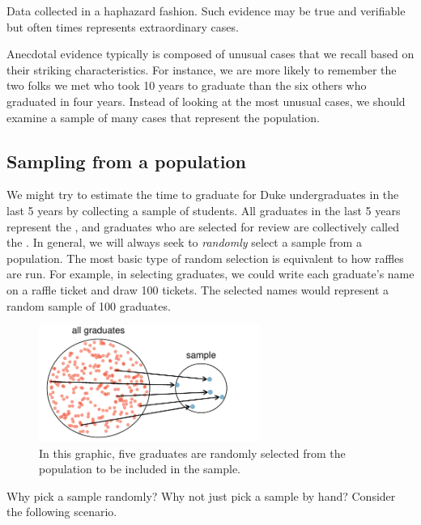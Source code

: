 \begin{termBox}{
Data collected in a haphazard fashion. Such evidence may be true and verifiable but often times represents extraordinary cases.}
\end{termBox}

Anecdotal evidence typically is composed of unusual cases that we recall based on their striking characteristics. For instance, we are more likely to remember the two folks we met who took 10 years to graduate than the six others who graduated in four years. Instead of looking at the most unusual cases, we should examine a sample of many cases that represent the population.

\subsection{Sampling from a population}

We might try to estimate the time to graduate for Duke undergraduates in the last 5 years by collecting a sample of students. All graduates in the last 5 years represent the , and graduates who are selected for review are collectively called the . In general, we will always seek to \emph{randomly} select a sample from a population. The most basic type of random selection is equivalent to how raffles are run. For example, in selecting graduates, we could write each graduate's name on a raffle ticket and draw 100 tickets. The selected names would represent a random sample of 100 graduates.
\begin{figure}[ht]
\centering
\includegraphics[height=1.5in]{01/figures/popToSample/popToSampleGraduates}
\caption{In this graphic, five graduates are randomly selected from the population to be included in the sample.}
\label{popToSampleGraduates}
\end{figure}

Why pick a sample randomly? Why not just pick a sample by hand? Consider the following scenario.


